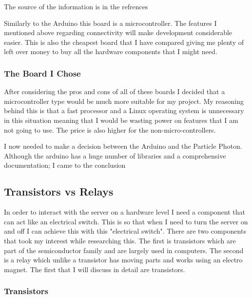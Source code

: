\documentclass{article}
\begin{document}
The source of the information is in the refrences\cite{particlePhotonSpec}
\newline

Similarly to the Arduino this board is a microcontroller. The features I mentioned above regarding
connectivity will make development considerable easier. This is also the cheapest board that I have
compared giving me plenty of left over money to buy all the hardware components that I might need.


\subsubsection{The Board I Chose}

After considering the pros and cons of all of these boards I decided that a microcontroller type
would be much more suitable for my project. My reasoning behind this is that a fast processor and
a Linux operating system is unnecessary in this situation meaning that I would be wasting power on
features that I am not going to use. The price is also higher for the non-micro-controllers.

I now needed to make a decision between the Arduino and the Particle Photon. Although the arduino has
a huge number of libraries and a comprehensive documentation; I came to the conclusion

\subsection{Transistors vs Relays}

In order to interact with the server on a hardware level I need a component that can act like an
electrical switch. This is so that when I need to turn the server on and off I can achieve this with
this "electrical switch". There are two components that took my interest while researching this. The
first is transistors which are part of the semiconductor family and are largely used in computers. The
second is a relay which unlike a transistor has moving parts and works using an electro magnet. The first
that I will discuss in detail are transistors.

\subsubsection{Transistors}
\end{document}
